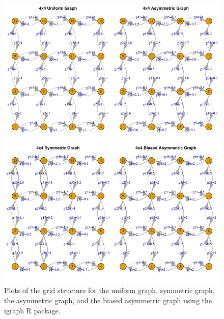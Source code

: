 \documentclass{article}
\begin{document}
\begin{figure}
\centering
     \includegraphics[scale=.8]{figs/4x4_grids}
    \caption{Plots of the grid structure 
    for the uniform graph, symmetric graph, the asymmetric graph,
    and the biased asymmetric graph 
    using the igraph R package.}
    \label{fig:4x4_grids}
\end{figure}
\end{document}
